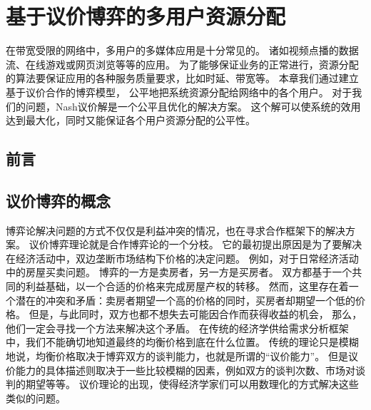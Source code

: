 \graphicspath{ {../body/nash_bargaining_figures/} }
\chapter{基于议价博弈的多用户资源分配}
在带宽受限的网络中，多用户的多媒体应用是十分常见的。
诸如视频点播的数据流、在线游戏或网页浏览等等的应用。
为了能够保证业务的正常进行，资源分配的算法要保证应用的各种服务质量要求，比如时延、带宽等。
本章我们通过建立基于议价合作的博弈模型，
公平地把系统资源分配给网络中的各个用户。
对于我们的问题，Nash议价解是一个公平且优化的解决方案。
这个解可以使系统的效用达到最大化，同时又能保证各个用户资源分配的公平性。

\section{前言}

\section{议价博弈的概念}
博弈论解决问题的方式不仅仅是利益冲突的情况，也在寻求合作框架下的解决方案。
议价博弈理论就是合作博弈论的一个分枝。
它的最初提出原因是为了要解决在经济活动中，双边垄断市场结构下价格的决定问题。
例如，对于日常经济活动中的房屋买卖问题。
博弈的一方是卖房者，另一方是买房者。
双方都基于一个共同的利益基础，以一个合适的价格来完成房屋产权的转移。
然而，这里存在着一个潜在的冲突和矛盾：卖房者期望一个高的价格的同时，买房者却期望一个低的价格。
但是，与此同时，双方也都不想失去可能因合作而获得收益的机会，
那么，他们一定会寻找一个方法来解决这个矛盾。
在传统的经济学供给需求分析框架中，我们不能确切地知道最终的均衡价格到底在什么位置。
传统的理论只是模糊地说，均衡价格取决于博弈双方的谈判能力，也就是所谓的“议价能力”。
但是议价能力的具体描述则取决于一些比较模糊的因素，例如双方的谈判次数、市场对谈判的期望等等。
议价理论的出现，使得经济学家们可以用数理化的方式解决这些类似的问题。

